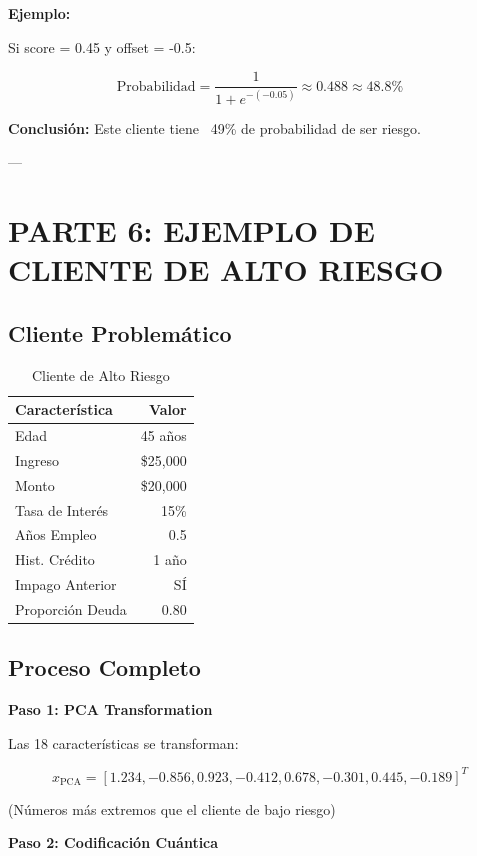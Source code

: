 \documentclass[11pt,a4paper,spanish]{article}
\begin{document}
\textbf{Ejemplo:}

Si score = 0.45 y offset = -0.5:

\[
\text{Probabilidad} = \frac{1}{1 + e^{-(-0.05)}} \approx 0.488 \approx 48.8\%
\]

\textbf{Conclusión:} Este cliente tiene ~49\% de probabilidad de ser riesgo.

---

\section{PARTE 6: EJEMPLO DE CLIENTE DE ALTO RIESGO}

\subsection{Cliente Problemático}

\begin{table}[H]
\centering
\begin{tabular}{|l|r|}
\hline
\textbf{Característica} & \textbf{Valor} \\
\hline
Edad & 45 años \\
Ingreso & \$25,000 \\
Monto & \$20,000 \\
Tasa de Interés & 15\% \\
Años Empleo & 0.5 \\
Hist. Crédito & 1 año \\
Impago Anterior & SÍ \\
Proporción Deuda & 0.80 \\
\hline
\end{tabular}
\caption{Cliente de Alto Riesgo}
\end{table}

\subsection{Proceso Completo}

\textbf{Paso 1: PCA Transformation}

Las 18 características se transforman:

\[
x_{\text{PCA}} = [1.234, -0.856, 0.923, -0.412, 0.678, -0.301, 0.445, -0.189]^T
\]

(Números más extremos que el cliente de bajo riesgo)

\textbf{Paso 2: Codificación Cuántica}
\end{document}
